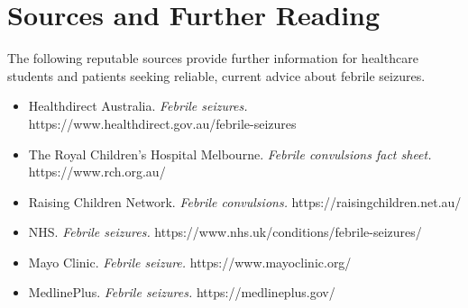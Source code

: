 \section*{Sources and Further Reading}
The following reputable sources provide further information for healthcare students and patients seeking reliable, current advice about febrile seizures.
\begin{itemize}
    \item Healthdirect Australia. \textit{Febrile seizures.} https://www.healthdirect.gov.au/febrile-seizures
    \item The Royal Children's Hospital Melbourne. \textit{Febrile convulsions fact sheet.} https://www.rch.org.au/
    \item Raising Children Network. \textit{Febrile convulsions.} https://raisingchildren.net.au/
    \item NHS. \textit{Febrile seizures.} https://www.nhs.uk/conditions/febrile-seizures/
    \item Mayo Clinic. \textit{Febrile seizure.} https://www.mayoclinic.org/
    \item MedlinePlus. \textit{Febrile seizures.} https://medlineplus.gov/
\end{itemize}
